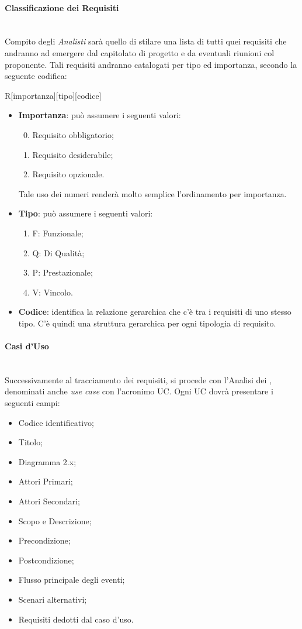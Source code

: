 \paragraph{Classificazione dei Requisiti}\mbox{}\\
Compito degli \textit{Analisti} sarà quello di stilare una lista di tutti quei requisiti che andranno ad emergere dal capitolato di progetto e da eventuali riunioni col proponente. Tali requisiti andranno catalogati per tipo ed importanza, secondo la seguente codifica:
\begin{center}
R[importanza][tipo][codice]
\end{center}
\begin{itemize}
\item \textbf{Importanza}: può assumere i seguenti valori:
\begin{enumerate}
\setcounter{enumi}{-1}
\item Requisito obbligatorio;
\item Requisito desiderabile;
\item Requisito opzionale.
\end{enumerate}
Tale uso dei numeri renderà molto semplice l'ordinamento per importanza.
\item \textbf{Tipo}: può assumere i seguenti valori:
\begin{enumerate}
\item[]F: Funzionale;
\item[]Q: Di Qualità;
\item[]P: Prestazionale;
\item[]V: Vincolo.
\end{enumerate}
\item \textbf{Codice}: identifica la relazione gerarchica che c'è tra i requisiti di uno stesso tipo. C'è quindi una struttura gerarchica per ogni tipologia di requisito.
\end{itemize}

\paragraph{Casi d'Uso}\mbox{}\\
Successivamente al tracciamento dei requisiti, si procede con l'Analisi dei , denominati anche \textit{use case} con l'acronimo UC. Ogni UC dovrà presentare i seguenti campi:
\begin{itemize}
\item Codice identificativo;
\item Titolo;
\item Diagramma 2.x;
\item Attori Primari;
\item Attori Secondari;
\item Scopo e Descrizione;
\item Precondizione;
\item Postcondizione;
\item Flusso principale degli eventi;
\item Scenari alternativi;
\item Requisiti dedotti dal caso d'uso.
\end{itemize}

